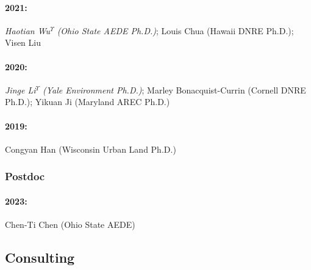 \documentclass[12pt]{res} %
\begin{document}
\begin{resume}
\paragraph{2021:} \textit{Haotian Wu$^\Upsilon$ (Ohio State AEDE Ph.D.)}; Louis Chua (Hawaii DNRE Ph.D.); Visen Liu
\vspace{-.35in}
\paragraph{2020:} \textit{Jinge Li$^\Upsilon$ (Yale Environment Ph.D.)}; Marley Bonacquist-Currin (Cornell DNRE Ph.D.); Yikuan Ji (Maryland AREC Ph.D.)
\vspace{-.35in}
\paragraph{2019:} Congyan Han (Wisconsin Urban Land Ph.D.)

\vspace{-.2in}

\subsubsection{Postdoc}\vspace{-.2in}
\paragraph{2023:} Chen-Ti Chen (Ohio State AEDE)

\vspace{-.2in}




\subsection{Consulting}


\end{resume}
\end{document}
